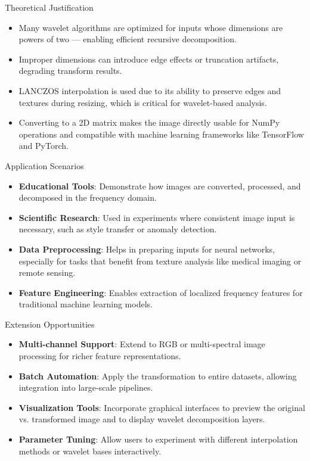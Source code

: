 \documentclass{beamer}
\begin{document}
\begin{frame}{Theoretical Justification}
\begin{itemize}
    \item Many wavelet algorithms are optimized for inputs whose dimensions are powers of two — enabling efficient recursive decomposition.
    \item Improper dimensions can introduce edge effects or truncation artifacts, degrading transform results.
    \item LANCZOS interpolation is used due to its ability to preserve edges and textures during resizing, which is critical for wavelet-based analysis.
    \item Converting to a 2D matrix makes the image directly usable for NumPy operations and compatible with machine learning frameworks like TensorFlow and PyTorch.
\end{itemize}
\end{frame}

\begin{frame}{Application Scenarios}
\begin{itemize}
    \item \textbf{Educational Tools}: Demonstrate how images are converted, processed, and decomposed in the frequency domain.
    \item \textbf{Scientific Research}: Used in experiments where consistent image input is necessary, such as style transfer or anomaly detection.
    \item \textbf{Data Preprocessing}: Helps in preparing inputs for neural networks, especially for tasks that benefit from texture analysis like medical imaging or remote sensing.
    \item \textbf{Feature Engineering}: Enables extraction of localized frequency features for traditional machine learning models.
\end{itemize}
\end{frame}

\begin{frame}{Extension Opportunities}
\begin{itemize}
    \item \textbf{Multi-channel Support}: Extend to RGB or multi-spectral image processing for richer feature representations.
    \item \textbf{Batch Automation}: Apply the transformation to entire datasets, allowing integration into large-scale pipelines.
    \item \textbf{Visualization Tools}: Incorporate graphical interfaces to preview the original vs. transformed image and to display wavelet decomposition layers.
    \item \textbf{Parameter Tuning}: Allow users to experiment with different interpolation methods or wavelet bases interactively.
\end{itemize}
\end{frame}
\end{document}
